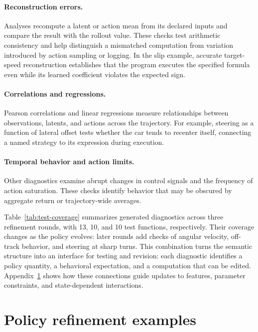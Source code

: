 \paragraph{Reconstruction errors.}
Analyses recompute a latent or action mean from its declared inputs and compare the result with the rollout value.
These checks test arithmetic consistency and help distinguish a mismatched computation from variation introduced by action sampling or logging.
In the slip example, accurate target-speed reconstruction establishes that the program executes the specified formula even while its learned coefficient violates the expected sign.

\paragraph{Correlations and regressions.}
Pearson correlations and linear regressions measure relationships between observations, latents, and actions across the trajectory.
For example, steering as a function of lateral offset tests whether the car tends to recenter itself, connecting a named strategy to its expression during execution.

\paragraph{Temporal behavior and action limits.}
Other diagnostics examine abrupt changes in control signals and the frequency of action saturation.
These checks identify behavior that may be obscured by aggregate return or trajectory-wide averages.

Table~\ref{tab:test-coverage} summarizes generated diagnostics across three refinement rounds, with 13, 10, and 10 test functions, respectively.
Their coverage changes as the policy evolves: later rounds add checks of angular velocity, off-track behavior, and steering at sharp turns.
This combination turns the semantic structure into an interface for testing and revision: each diagnostic identifies a policy quantity, a behavioral expectation, and a computation that can be edited.
Appendix~\ref{app:records} shows how these connections guide updates to features, parameter constraints, and state-dependent interactions.



\section{Policy refinement examples}
\label{app:records}

